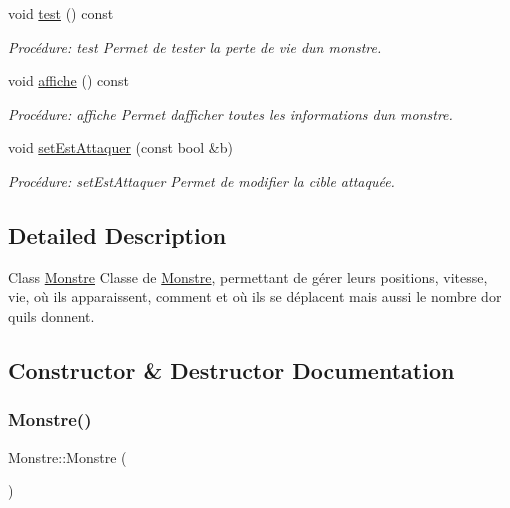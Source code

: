 \begin{DoxyCompactItemize}
void \hyperlink{classMonstre_a82b15e169ab7a45dc9dc229256f89029}{test} () const
\begin{DoxyCompactList}\small\item\em Procédure\+: test Permet de tester la perte de vie d\textquotesingle{}un monstre. \end{DoxyCompactList}\item 
void \hyperlink{classMonstre_ad6fe422be19d7989676ef0707924c8f9}{affiche} () const
\begin{DoxyCompactList}\small\item\em Procédure\+: affiche Permet d\textquotesingle{}afficher toutes les informations d\textquotesingle{}un monstre. \end{DoxyCompactList}\item 
void \hyperlink{classMonstre_af426bb7333d4b59352997435b4b6f890}{set\+Est\+Attaquer} (const bool \&b)
\begin{DoxyCompactList}\small\item\em Procédure\+: set\+Est\+Attaquer Permet de modifier la cible attaquée. \end{DoxyCompactList}\end{DoxyCompactItemize}


\subsection{Detailed Description}
Class \hyperlink{classMonstre}{Monstre} Classe de \hyperlink{classMonstre}{Monstre}, permettant de gérer leurs positions, vitesse, vie, où ils apparaissent, comment et où ils se déplacent mais aussi le nombre d\textquotesingle{}or qu\textquotesingle{}ils donnent. 

\subsection{Constructor \& Destructor Documentation}
\mbox{\label{classMonstre_a8efe47ee8ea4b5ee8e5d3820e620059b}} 
\subsubsection{\texorpdfstring{Monstre()}{Monstre()}\hspace{0.1cm}{\footnotesize\ttfamily [1/3]}}
{\footnotesize\ttfamily Monstre\+::\+Monstre (\begin{DoxyParamCaption}{ }\end{DoxyParamCaption})}



